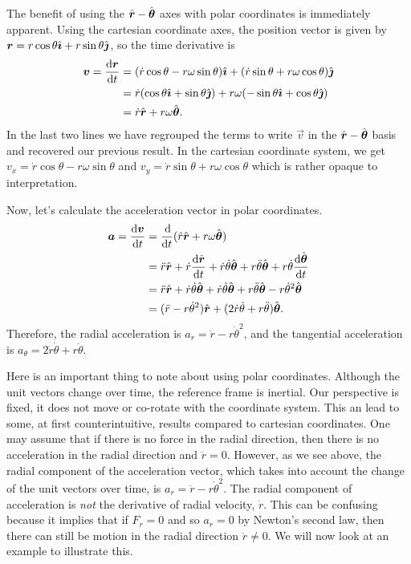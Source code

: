 \documentclass[../classical_mechanics.tex]{subfiles}
\begin{document}
        The benefit of using the $\hat{\boldsymbol{r}}-\hat{\boldsymbol{\theta}}$ axes with polar coordinates is immediately apparent.
        Using the cartesian coordinate axes, the position vector is given by $\boldsymbol{r}=r\cos\theta\hat{\boldsymbol{\imath}}+r\sin\theta\hat{\boldsymbol{\jmath}}$, so the time derivative is
        \begin{align}
            \vec{v}=\dv{\vec{r}}{t}&=(\dot{r}\cos\theta-r\omega\sin\theta)\ihat+(\dot{r}\sin\theta+r\omega\cos\theta)\jhat\label{eq:2d-polar-velocity-cartesian}\\
            &=\dot{r}(\cos\theta\ihat+\sin\theta\jhat)+r\omega(-\sin\theta\ihat+\cos\theta\jhat)\\
            &=\dot{r}\uvec{r}+r\omega\uvec{\theta}.
        \end{align}
        In the last two lines we have regrouped the terms to write $\vec{v}$ in the $\hat{\boldsymbol{r}}-\hat{\boldsymbol{\theta}}$ basis and recovered our previous result.
        In the cartesian coordinate system, we get $v_x=\dot{r}\cos\theta-r\omega\sin\theta$ and $v_y=\dot{r}\sin\theta+r\omega\cos\theta$ which is rather opaque to interpretation.

        Now, let's calculate the acceleration vector in polar coordinates.
        \begin{align}
            \vec{a}=\dv{\vec{v}}{t}&=\dv{}{t}(\dot{r}\uvec{r}+r\omega\uvec{\theta})\\
            &=\ddot{r}\uvec{r}+\dot{r}\dv{\uvec{r}}{t}+\dot{r}\dot{\theta}\uvec{\theta}+r\ddot{\theta}\uvec{\theta}+r\dot{\theta}\dv{\uvec{\theta}}{t}\\
            &=\ddot{r}\uvec{r}+\dot{r}\dot{\theta}\uvec{\theta}+\dot{r}\dot{\theta}\uvec{\theta}+r\ddot{\theta}\uvec{\theta}-r\dot{\theta}^2\uvec{\theta}\\
            &=(\ddot{r}-r\dot{\theta}^2)\uvec{r}+(2\dot{r}\dot{\theta}+r\ddot{\theta})\uvec{\theta}.\label{eq:2d-polar-acceleration}
        \end{align}
        Therefore, the radial acceleration is $a_r=\ddot{r}-r\dot{\theta}^2$, and the tangential acceleration is $a_\theta= 2\dot{r}\dot{\theta}+r\ddot{\theta}$.

        Here is an important thing to note about using polar coordinates.
        Although the unit vectors change over time, the reference frame is inertial.
        Our perspective is fixed, it does not move or co-rotate with the coordinate system.
        This an lead to some, at first counterintuitive, results compared to cartesian coordinates.
        One may assume that if there is no force in the radial direction, then there is no acceleration in the radial direction and $\ddot{r}=0$.
        However, as we see above, the radial component of the acceleration vector, which takes into account the change of the unit vectors over time, is $a_r=\ddot{r}-r\dot{\theta}^2$.
        The radial component of acceleration is \textit{not} the derivative of radial velocity, $\dot{r}$.
        This can be confusing because it implies that if $F_r=0$ and so $a_r=0$ by Newton's second law, then there can still be motion in the radial direction $\ddot{r}\neq0$.
        We will now look at an example to illustrate this.
\end{document}
